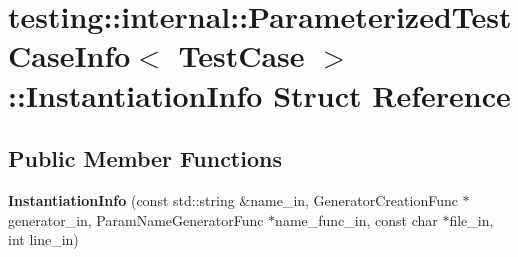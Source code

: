 \hypertarget{structtesting_1_1internal_1_1_parameterized_test_case_info_1_1_instantiation_info}{}\section{testing\+:\+:internal\+:\+:Parameterized\+Test\+Case\+Info$<$ Test\+Case $>$\+:\+:Instantiation\+Info Struct Reference}
\label{structtesting_1_1internal_1_1_parameterized_test_case_info_1_1_instantiation_info}
\subsection*{Public Member Functions}
\begin{DoxyCompactItemize}
\item 
\mbox{\label{structtesting_1_1internal_1_1_parameterized_test_case_info_1_1_instantiation_info_a80b9f6ae2c4cf66883b73d1e6c290a6b}} 
{\bfseries Instantiation\+Info} (const std\+::string \&name\+\_\+in, Generator\+Creation\+Func $\ast$generator\+\_\+in, Param\+Name\+Generator\+Func $\ast$name\+\_\+func\+\_\+in, const char $\ast$file\+\_\+in, int line\+\_\+in)
\end{DoxyCompactItemize}
